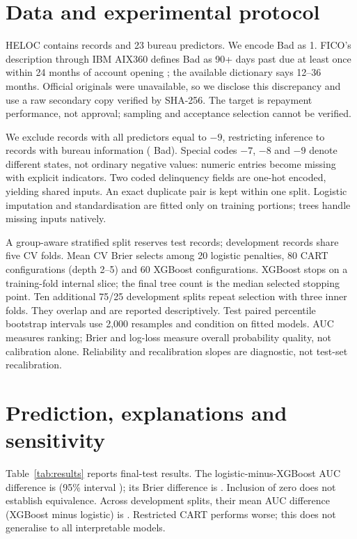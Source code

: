\documentclass[11pt,a4paper]{article}
\begin{document}
\section{Data and experimental protocol}
HELOC contains \NRaw{} records and 23 bureau predictors. We encode Bad as 1. FICO's description through IBM AIX360 defines Bad as 90+ days past due at least once within 24 months of account opening \cite{aix360heloc}; the available dictionary says 12--36 months. Official originals were unavailable, so we disclose this discrepancy and use a raw secondary copy verified by SHA-256. The target is repayment performance, not approval; sampling and acceptance selection cannot be verified.

We exclude \NAllNine{} records with all predictors equal to $-9$, restricting inference to \NPop{} records with bureau information (\BadRatePop{} Bad). Special codes $-7$, $-8$ and $-9$ denote different states, not ordinary negative values: numeric entries become missing with explicit indicators. Two coded delinquency fields are one-hot encoded, yielding \NCols{} shared inputs. An exact duplicate pair is kept within one split. Logistic imputation and standardisation are fitted only on training portions; trees handle missing inputs natively.

A group-aware stratified split reserves \NTest{} test records; \NDev{} development records share five CV folds. Mean CV Brier selects among 20 logistic penalties, 80 CART configurations (depth 2--5) and 60 XGBoost configurations. XGBoost stops on a training-fold internal slice; the final tree count is the median selected stopping point. Ten additional 75/25 development splits repeat selection with three inner folds. They overlap and are reported descriptively. Test paired percentile bootstrap intervals use 2,000 resamples and condition on fitted models. AUC measures ranking; Brier and log-loss measure overall probability quality, not calibration alone. Reliability and recalibration slopes are diagnostic, not test-set recalibration.

\section{Prediction, explanations and sensitivity}
Table~\ref{tab:results} reports final-test results. The logistic-minus-XGBoost AUC difference is \dAUCLRXGB{} (95\% interval \dAUCciLRXGB); its Brier difference is \dBrierLRXGB{} \dBrierciLRXGB. Inclusion of zero does not establish equivalence. Across development splits, their mean AUC difference (XGBoost minus logistic) is \RepAucDiffXGBLR{}. Restricted CART performs worse; this does not generalise to all interpretable models.
\end{document}
